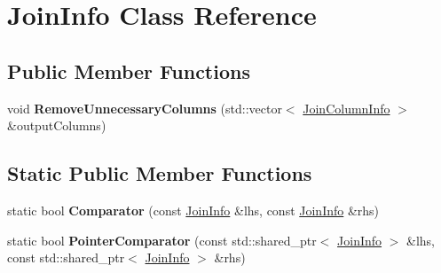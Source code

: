 \hypertarget{class_join_info}{\section{Join\+Info Class Reference}
\label{class_join_info}
}
\subsection*{Public Member Functions}
\begin{DoxyCompactItemize}
\item 
\hypertarget{class_join_info_aa4c03bd8c1d0a7f4a5b89287d69f89b5}{void {\bfseries Remove\+Unnecessary\+Columns} (std\+::vector$<$ \hyperlink{class_join_column_info}{Join\+Column\+Info} $>$ \&output\+Columns)}\label{class_join_info_aa4c03bd8c1d0a7f4a5b89287d69f89b5}

\end{DoxyCompactItemize}
\subsection*{Static Public Member Functions}
\begin{DoxyCompactItemize}
\item 
\hypertarget{class_join_info_a17dc7332976ec81186a28355036ae54b}{static bool {\bfseries Comparator} (const \hyperlink{class_join_info}{Join\+Info} \&lhs, const \hyperlink{class_join_info}{Join\+Info} \&rhs)}\label{class_join_info_a17dc7332976ec81186a28355036ae54b}

\item 
\hypertarget{class_join_info_ab10a3eda42ac2491dd9ed77d503e6562}{static bool {\bfseries Pointer\+Comparator} (const std\+::shared\+\_\+ptr$<$ \hyperlink{class_join_info}{Join\+Info} $>$ \&lhs, const std\+::shared\+\_\+ptr$<$ \hyperlink{class_join_info}{Join\+Info} $>$ \&rhs)}\label{class_join_info_ab10a3eda42ac2491dd9ed77d503e6562}

\end{DoxyCompactItemize}
